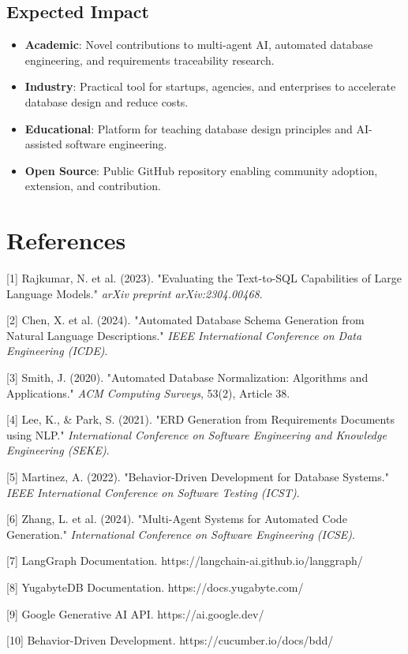 \documentclass[12pt,a4paper]{article}
\begin{document}
\subsection{Expected Impact}

\begin{itemize}
\item \textbf{Academic}: Novel contributions to multi-agent AI, automated database engineering, and requirements traceability research.

\item \textbf{Industry}: Practical tool for startups, agencies, and enterprises to accelerate database design and reduce costs.

\item \textbf{Educational}: Platform for teaching database design principles and AI-assisted software engineering.

\item \textbf{Open Source}: Public GitHub repository enabling community adoption, extension, and contribution.
\end{itemize}


\section{References}

[1] Rajkumar, N. et al. (2023). "Evaluating the Text-to-SQL Capabilities of Large Language Models." \textit{arXiv preprint arXiv:2304.00468}.

[2] Chen, X. et al. (2024). "Automated Database Schema Generation from Natural Language Descriptions." \textit{IEEE International Conference on Data Engineering (ICDE)}.

[3] Smith, J. (2020). "Automated Database Normalization: Algorithms and Applications." \textit{ACM Computing Surveys}, 53(2), Article 38.

[4] Lee, K., \& Park, S. (2021). "ERD Generation from Requirements Documents using NLP." \textit{International Conference on Software Engineering and Knowledge Engineering (SEKE)}.

[5] Martinez, A. (2022). "Behavior-Driven Development for Database Systems." \textit{IEEE International Conference on Software Testing (ICST)}.

[6] Zhang, L. et al. (2024). "Multi-Agent Systems for Automated Code Generation." \textit{International Conference on Software Engineering (ICSE)}.

[7] LangGraph Documentation. https://langchain-ai.github.io/langgraph/

[8] YugabyteDB Documentation. https://docs.yugabyte.com/

[9] Google Generative AI API. https://ai.google.dev/

[10] Behavior-Driven Development. https://cucumber.io/docs/bdd/
\end{document}
